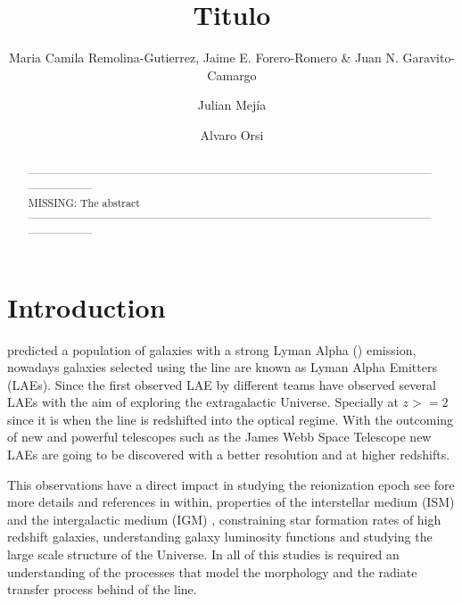 \documentclass{latex/emulateapj}
\begin{document}
\title{Titulo}


\author{Maria Camila Remolina-Gutierrez, Jaime E. Forero-Romero \&
  Juan N. Garavito-Camargo} 
\author{Julian Mej\'ia}
\author{Alvaro Orsi}


\begin{abstract}
\noindent ------------------------------------------------------------------------------------------------------------------------------------\\
MISSING: The abstract\\
------------------------------------------------------------------------------------------------------------------------------------\\
\end{abstract}

\section{Introduction}
\label{sec:intro}

\cite{PartridgePeebles} predicted a population of galaxies with a strong Lyman Alpha (\lya) emission,  nowadays galaxies selected using the \lya line are known as Lyman Alpha Emitters (LAEs). Since the first observed LAE by \cite{DjorgovskiThompson} different teams have observed several LAEs \cite{Rhoads00,Gawiser2007,Koehler2007,Ouchi08,Yamada2012,Schenker2012,Kulas12, Yamada2012, Chonis2013,Finkelstein2013,Ostlin14} with the aim of exploring the extragalactic Universe.  Specially at $z>=2$ since it is when the  line is redshifted into the optical regime. With the outcoming of new and powerful telescopes such as the James Webb Space Telescope new LAEs are going to be discovered with a better resolution and at
higher redshifts. 
  
This observations have a direct impact in studying the reionization epoch see \cite{review} fore more details and references in within, properties of the interstellar medium (ISM) and the intergalactic medium (IGM) \citep{Behrens13} \citep{DijkstraKramer}, constraining star formation rates of high redshift galaxies, understanding galaxy luminosity functions \cite{Max} and studying the large scale structure of the Universe. In all of this
studies is required an understanding of the processes that model the morphology and the radiate transfer process 
behind  of the \lya line. 
\end{document}
